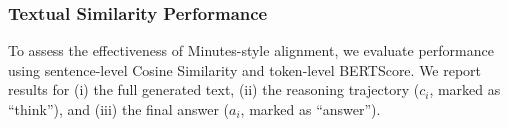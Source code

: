 




\subsubsection*{Textual Similarity Performance}

%
To assess the effectiveness of Minutes-style alignment, we evaluate performance using sentence-level Cosine Similarity and token-level BERTScore. We report results for (i) the full generated text, (ii) the reasoning trajectory ($c_i$, marked as ``think''), and (iii) the final answer ($a_i$, marked as ``answer'').

